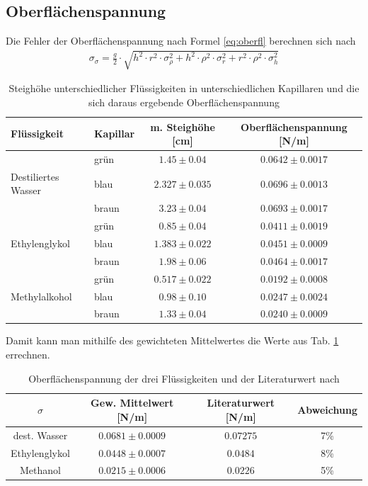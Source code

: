 \documentclass[12pt,a4paper,titlepage,headinclude,bibtotoc]{scrartcl}
\begin{document}
\subsection{Oberflächenspannung}
Die Fehler der Oberflächenspannung nach Formel \eqref{eq:oberfl} berechnen sich nach
\begin{align*}
\sigma_{\sigma}=\frac{g}{2} \cdot \sqrt{h^{2} \cdot r^{2} \cdot \sigma_{\rho}^{2} + h^{2} \cdot \rho^{2} \cdot \sigma_{r}^{2} + r^{2} \cdot \rho^{2} \cdot \sigma_{h}^{2}}
\end{align*}
\begin{table}[!h]
\centering
\begin{tabular}{|l|l|c|c|}
\hline
Flüssigkeit 	     &Kapillar 	& m. Steighöhe [cm]		& Oberflächenspannung [N/m]\\\hline\hline
				&grün	& $1.45\pm 0.04$	&$ 0.0642 \pm 0.0017 $\\
Destiliertes Wasser		&blau	& $2.327\pm 0.035$	&$ 0.0696 \pm 0.0013 $\\
            			&braun	& $3.23\pm 0.04$	&$ 0.0693 \pm 0.0017 $\\\hline
				&grün	& $0.85\pm 0.04$	&$ 0.0411 \pm 0.0019 $\\
Ethylenglykol			&blau	& $1.383\pm 0.022$	&$ 0.0451 \pm 0.0009 $\\
				&braun	& $1.98\pm 0.06$	&$ 0.0464 \pm 0.0017 $\\\hline
				&grün	& $0.517\pm 0.022$	&$ 0.0192 \pm 0.0008 $\\
Methylalkohol			&blau	& $0.98\pm 0.10$	&$ 0.0247 \pm 0.0024 $\\
				&braun	& $1.33\pm 0.04$	&$ 0.0240 \pm 0.0009 $\\
\hline
\end{tabular}
\caption{Steighöhe unterschiedlicher Flüssigkeiten in unterschiedlichen Kapillaren und die sich daraus ergebende Oberflächenspannung}
\end{table}
Damit kann man mithilfe des gewichteten Mittelwertes die Werte aus Tab. \ref{tab:sigma} errechnen.\\

\begin{table}[!h]
\centering
\begin{tabular}{|c||c|c|c|}
\hline
$\sigma$ 		& Gew. Mittelwert [\si{\newton/\meter}]	& Literaturwert [\si{\newton/\meter}]	& Abweichung\\\hline\hline
dest. Wasser 		& $ 0.0681 \pm 0.0009 $			&$0.07275$				&7\%	\\\hline 
Ethylenglykol 		& $ 0.0448 \pm 0.0007 $ 		&$0.0484$				&8\%	\\\hline 
Methanol		& $ 0.0215 \pm 0.0006 $			&$0.0226$				&5\%	\\ 
\hline 
\end{tabular} 
\caption{Oberflächenspannung der drei Flüssigkeiten und der Literaturwert nach \protect\footnotemark\label{tab:sigma}}
\end{table}
\end{document}
